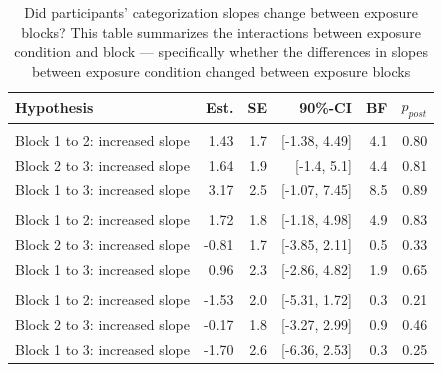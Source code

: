 \documentclass[
  11pt,
  man,mask,floatsintext]{apa6}
\begin{document}
\begin{table}[H]
\centering
\caption{\label{tab:hypothesis-table-exposure-simple-slopes-block}Did participants’ categorization slopes change between exposure blocks? This table summarizes the interactions between exposure condition and block --- specifically whether the differences in slopes between exposure condition changed between exposure blocks}
\centering
\begin{tabular}[t]{>{\raggedright\arraybackslash}p{15em}rrrrr}
\toprule
Hypothesis & Est. & SE & 90\%-CI & BF & $p_{post}$\\
\midrule
\addlinespace[0.3em]
\multicolumn{6}{l}{\textbf{Difference between blocks: baseline}}\\
\hspace{1em}Block 1 to 2: increased slope & 1.43 & 1.7 & {}[-1.38, 4.49] & 4.1 & 0.80\\
\hspace{1em}Block 2 to 3: increased slope & 1.64 & 1.9 & {}[-1.4, 5.1] & 4.4 & 0.81\\
\hspace{1em}Block 1 to 3: increased slope & 3.17 & 2.5 & {}[-1.07, 7.45] & 8.5 & 0.89\\
\addlinespace[0.3em]
\multicolumn{6}{l}{\textbf{Difference between blocks: +10}}\\
\hspace{1em}Block 1 to 2: increased slope & 1.72 & 1.8 & {}[-1.18, 4.98] & 4.9 & 0.83\\
\hspace{1em}Block 2 to 3: increased slope & -0.81 & 1.7 & {}[-3.85, 2.11] & 0.5 & 0.33\\
\hspace{1em}Block 1 to 3: increased slope & 0.96 & 2.3 & {}[-2.86, 4.82] & 1.9 & 0.65\\
\addlinespace[0.3em]
\multicolumn{6}{l}{\textbf{Difference between blocks: +40}}\\
\hspace{1em}Block 1 to 2: increased slope & -1.53 & 2.0 & {}[-5.31, 1.72] & 0.3 & 0.21\\
\hspace{1em}Block 2 to 3: increased slope & -0.17 & 1.8 & {}[-3.27, 2.99] & 0.9 & 0.46\\
\hspace{1em}Block 1 to 3: increased slope & -1.70 & 2.6 & {}[-6.36, 2.53] & 0.3 & 0.25\\
\bottomrule
\end{tabular}
\end{table}
\end{document}
